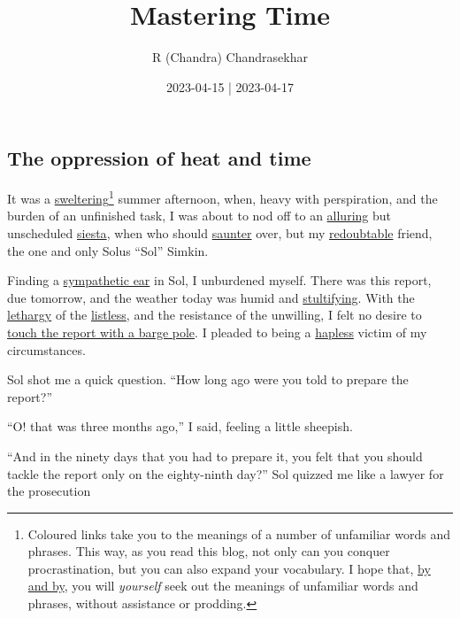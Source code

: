\documentclass[
  a4paper,
]{article}
\title{Mastering Time}
\author{R (Chandra) Chandrasekhar}
\date{2023-04-15 | 2023-04-17}
\begin{document}
\maketitle

\thispagestyle{empty}


\subsection{The oppression of heat and
time}\label{the-oppression-of-heat-and-time}

It was a
\href{https://dictionary.cambridge.org/dictionary/english/sweltering}{sweltering}\footnote{Coloured
  links take you to the meanings of a number of unfamiliar words and
  phrases. This way, as you read this blog, not only can you conquer
  procrastination, but you can also expand your vocabulary. I hope that,
  \href{https://dictionary.cambridge.org/dictionary/english/by-and-by}{by
  and by}, you will \emph{yourself} seek out the meanings of unfamiliar
  words and phrases, without assistance or prodding.} summer afternoon,
when, heavy with perspiration, and the burden of an unfinished task, I
was about to nod off to an
\href{https://www.thefreedictionary.com/alluring}{alluring} but
unscheduled
\href{https://www.collinsdictionary.com/dictionary/english/siesta}{siesta},
when who should
\href{https://www.thefreedictionary.com/saunter}{saunter} over, but my
\href{https://www.vocabulary.com/dictionary/redoubtable}{redoubtable}
friend, the one and only Solus ``Sol'' Simkin.

Finding a
\href{https://www.macmillandictionary.com/dictionary/british/a-sympathetic-ear}{sympathetic
ear} in Sol, I unburdened myself. There was this report, due tomorrow,
and the weather today was humid and
\href{https://www.macmillandictionary.com/dictionary/british/stultifying}{stultifying}.
With the
\href{https://www.merriam-webster.com/dictionary/lethargy}{lethargy} of
the \href{https://www.thefreedictionary.com/listless}{listless}, and the
resistance of the unwilling, I felt no desire to
\href{https://idioms.thefreedictionary.com/I+wouldn\%27t+touch+with+a+barge+pole}{touch
the report with a barge pole}. I pleaded to being a
\href{https://www.dictionary.com/browse/hapless}{hapless} victim of my
circumstances.

Sol shot me a quick question. ``How long ago were you told to prepare
the report?''

``O! that was three months ago,'' I said, feeling a little sheepish.

``And in the ninety days that you had to prepare it, you felt that you
should tackle the report only on the eighty-ninth day?'' Sol quizzed me
like a lawyer for the prosecution
\end{document}
